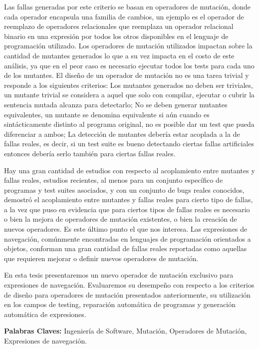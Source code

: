 Las fallas generadas por este criterio se basan en operadores de mutaci\'on, donde cada operador encapsula una familia de cambios, un ejemplo es el operador de reemplazo de operadores relacionales que reemplaza un operador relacional binario en una expresi\'on por todos los otros disponibles en el lenguaje de programaci\'on utilizado. Los operadores de mutaci\'on utilizados impactan sobre la cantidad de mutantes generados lo que a su vez impacta en el costo de este an\'alisis, ya que en el peor caso es necesario ejecutar todos los tests para cada uno de los mutantes. El dise\~no de un operador de mutaci\'on no es una tarea trivial y responde a los siguientes criterios: Los mutantes generados no deben ser triviales, un mutante trivial se considera a aquel que solo con compilar, ejecutar o cubrir la sentencia mutada alcanza para detectarlo; No se deben generar mutantes equivalentes, un mutante se denomina equivalente si a\'un cuando es sint\'acticamente distinto al programa original, no es posible dar un test que pueda diferenciar a ambos; La detecci\'on de mutantes deber\'ia estar acoplada a la de fallas reales, es decir, si un test suite es bueno detectando ciertas fallas artificiales entonces deber\'ia serlo tambi\'en para ciertas fallas reales.

Hay una gran cantidad de estudios con respecto al acoplamiento entre mutantes y fallas reales, estudios recientes, al menos para un conjunto espec\'ifico de programas y test suites asociados, y con un conjunto de bugs reales conocidos, demostr\'o el acoplamiento entre mutantes y fallas reales para cierto tipo de fallas, a la vez que puso en evidencia que para ciertos tipos de fallas reales es necesario o bien la mejora de operadores de mutaci\'on existentes, o bien la creaci\'on de nuevos operadores. Es este \'ultimo punto el que nos interesa. Las expresiones de navegaci\'on, com\'unmente encontradas en lenguajes de programaci\'on orientados a objetos, conforman una gran cantidad de fallas reales reportadas como aquellas que requieren mejorar o definir nuevos operadores de mutaci\'on.

En esta tesis presentaremos un nuevo operador de mutaci\'on exclusivo para expresiones de navegaci\'on. Evaluaremos su desempe\~no con respecto a los criterios de dise\~no para operadores de mutaci\'on presentados anteriormente, su utilizaci\'on en los campos de testing, reparaci\'on autom\'atica de programas y generaci\'on autom\'atica de expresiones.

\noindent
\textbf{Palabras Claves:} Ingenier\'ia de Software, Mutaci\'on, Operadores de Mutaci\'on, Expresiones de navegaci\'on.\\

